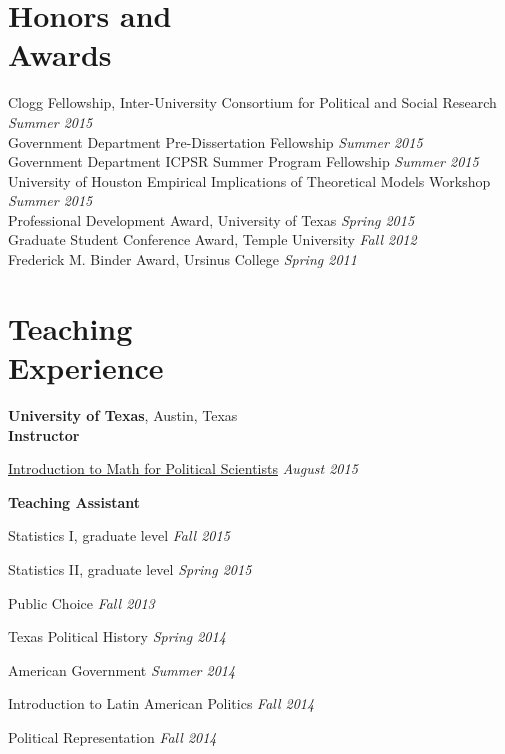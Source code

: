 \documentclass[margin,line]{res}
\newenvironment{list2}{
    \begin{list}{--}{%
        \setlength{\itemsep}{0in}
        \setlength{\parsep}{0in} \setlength{\parskip}{0in}
        \setlength{\topsep}{0in} \setlength{\partopsep}{0in}
        \setlength{\leftmargin}{0.2in}}}{\end{list}}
\begin{document}
\begin{resume}
\section{\sc Honors and \\Awards}
Clogg Fellowship, Inter-University Consortium for Political and Social Research \hfill {\em Summer 2015} \\
Government Department Pre-Dissertation Fellowship   \hfill {\em Summer 2015} \\
Government Department ICPSR Summer Program Fellowship     \hfill    {\em Summer 2015} \\
University of Houston Empirical Implications of Theoretical Models Workshop  \hfill    {\em Summer 2015} \\
Professional Development Award, University of Texas \hfill    {\em Spring 2015} \\
Graduate Student Conference Award, Temple University \hfill    {\em Fall 2012} \\
Frederick M. Binder Award, Ursinus College \hfill    {\em Spring 2011} %

\section{\sc Teaching \\Experience}
{\bf University of Texas}, Austin, Texas  \\
{\bf Instructor}
\begin{list2}
	\item \href{https://github.com/jabranham/math-camp}{Introduction to Math for Political Scientists} \hfill {\em August 2015}
\end{list2}
{\bf Teaching Assistant} 

\begin{list2}
    \item Statistics I, graduate level \hfill {\em Fall 2015}
	\item Statistics II, graduate level \hfill {\em Spring 2015}
    \item Public Choice \hfill {\em Fall 2013}
    \item Texas Political History \hfill {\em Spring 2014}
    \item American Government \hfill {\em Summer 2014}
    \item Introduction to Latin American Politics \hfill {\em Fall 2014}
    \item Political Representation \hfill {\em Fall 2014}
\end{list2}


\end{resume}
\end{document}
